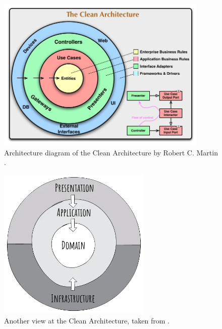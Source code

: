 \begin{figure} [H]
    \centering
    \includegraphics[width=0.9\textwidth]{figures/clean-architecture.jpg}
    \caption{Architecture diagram of the Clean Architecture by Robert C. Martin \cite{robert_martin:clean_architecture}.}
    \label{fig:arch:clean_architecture}
\end{figure}

\begin{figure} [H]
    \centering
    \includegraphics[width=0.65\textwidth]{figures/mod-clean-architecture.png}
    \caption{Another view at the Clean Architecture, taken from \cite{dorin_baba:clean_architecture}.}
    \label{fig:arch:modern_clean_architecture}
\end{figure}

